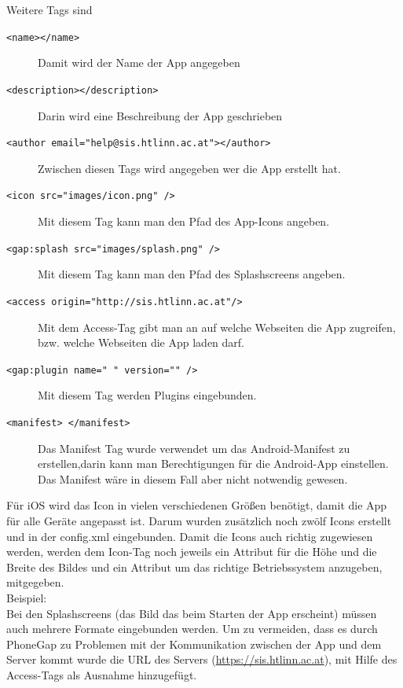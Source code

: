 Weitere Tags sind\\
\begin{description}
\item[\texttt{<name></name>}] Damit wird der Name der App angegeben
\item[\texttt{<description></description>}] Darin wird eine Beschreibung der App geschrieben
\item[\texttt{<author email="help@sis.htlinn.ac.at"></author>}] Zwischen diesen Tags wird angegeben wer die App erstellt hat.
\item[\texttt{<icon src="images/icon.png" />}] Mit diesem Tag kann man den Pfad des App-Icons angeben.
\item[\texttt{<gap:splash src="images/splash.png" />}] Mit diesem Tag kann man den Pfad des Splashscreens angeben.
\item[\texttt{<access origin="http://sis.htlinn.ac.at"/>}]Mit dem Access-Tag gibt man an auf welche Webseiten die App zugreifen, bzw. welche Webseiten die App laden darf.
\item[\texttt{<gap:plugin name=" " version="" />}] Mit diesem Tag werden Plugins eingebunden.
\item[\texttt{<manifest> </manifest>}] Das Manifest Tag wurde verwendet um das Android-Manifest zu erstellen,darin kann man	Berechtigungen für die Android-App einstellen. Das Manifest wäre in diesem Fall aber nicht notwendig gewesen.
\end{description}

Für iOS wird das Icon in vielen verschiedenen Größen benötigt, damit die App für alle Geräte angepasst ist. Darum wurden zusätzlich noch zwölf Icons erstellt und in der config.xml eingebunden. Damit die Icons auch richtig zugewiesen werden, werden dem Icon-Tag noch jeweils ein Attribut für die Höhe und die Breite des Bildes und ein Attribut um das richtige Betriebssystem anzugeben, mitgegeben.\\
Beispiel:\\


	

Bei den Splashscreens (das Bild das beim Starten der App erscheint) müssen auch mehrere Formate eingebunden werden.
Um zu vermeiden, dass es durch PhoneGap zu Problemen mit der Kommunikation zwischen der App und dem Server kommt wurde die URL des Servers (\href{https://sis.htlinn.ac.at}{https://sis.htlinn.ac.at}), mit Hilfe des Access-Tags als Ausnahme hinzugefügt.\\

